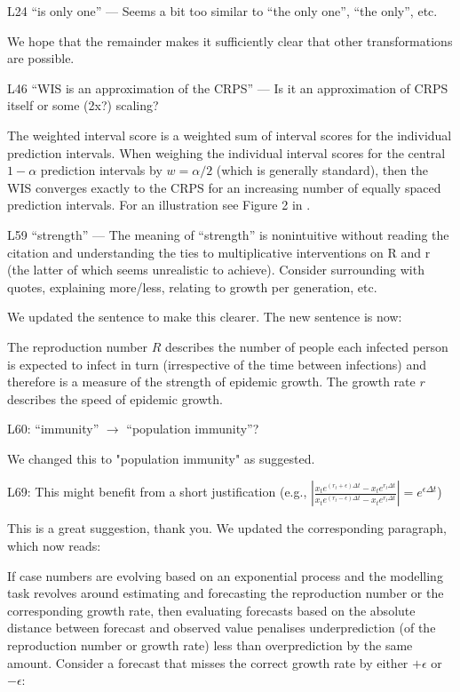 \documentclass{article}
\newcommand{\black}{\color{black}}
\newcommand{\blue}{\color{blue}}
\newcommand{\indented}{\setlength{\leftskip}{1cm}}
\newcommand{\notindented}{\setlength{\leftskip}{0cm}}
\begin{document}
\notindented

\blue
L24 “is only one” — Seems a bit too similar to “the only one”, “the only”, etc.

\black
We hope that the remainder makes it sufficiently clear that other transformations are possible. 

\blue
L46 “WIS is an approximation of the CRPS” — Is it an approximation of CRPS itself or some (2x?) scaling?

\black
The weighted interval score is a weighted sum of interval scores for the individual prediction intervals. When weighing the individual interval scores for the central $1 - \alpha$ prediction intervals by 
$w = \alpha / 2$ (which is generally standard), then the WIS converges exactly to the CRPS for an increasing number of equally spaced prediction intervals. For an illustration see Figure 2 in \cite{bracherEvaluatingEpidemicForecasts2021}.

\blue
L59 “strength” — The meaning of “strength” is nonintuitive without reading the citation and understanding the ties to multiplicative interventions on R and r (the latter of which seems unrealistic to achieve). Consider surrounding with quotes, explaining more/less, relating to growth per generation, etc.

\black
We updated the sentence to make this clearer. The new sentence is now: 

\indented
The reproduction number $R$ describes the number of people each infected person is expected to infect in turn (irrespective of the time between infections) and therefore is a measure of the strength of epidemic growth. The growth rate $r$ describes the speed of epidemic growth.

\notindented

\blue
L60: “immunity” $\xrightarrow{}$ “population immunity”?

\black
We changed this to "population immunity" as suggested. 

\blue
L69: This might benefit from a short justification (e.g.,
$\left| \frac{x_t e^{(r_t + \epsilon) \Delta t} - x_t e^{r_t \Delta t}}{x_t e^{(r_t - \epsilon) \Delta t} - x_t e^{r_t \Delta t}} \right| = e^{\epsilon\Delta t}$)

\black
This is a great suggestion, thank you. We updated the corresponding paragraph, which now reads: 

\indented
If case numbers are evolving based on an exponential process and the  modelling task revolves around estimating and forecasting the reproduction number or the corresponding growth rate, then evaluating forecasts based on the absolute distance between forecast and observed value penalises underprediction (of the reproduction number or growth rate) less than overprediction by the same amount. Consider a forecast that misses the correct growth rate by either $+\epsilon$ or $-\epsilon$:
\end{document}

